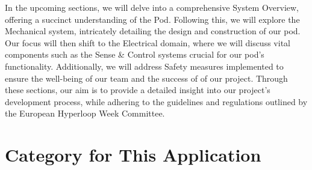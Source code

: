 In the upcoming sections, we will delve into a comprehensive System Overview, offering a succinct understanding of the Pod. Following this, we will explore the Mechanical system, intricately detailing the design and construction of our pod. Our focus will then shift to the Electrical domain, where we will discuss vital components such as the Sense \& Control systems crucial for our pod's functionality. Additionally, we will address Safety measures implemented to ensure the well-being of our team and the success of of our project. Through these sections, our aim is to provide a detailed insight into our project's development process, while adhering to the guidelines and regulations outlined by the European Hyperloop Week Committee.

\section{Category for This Application}